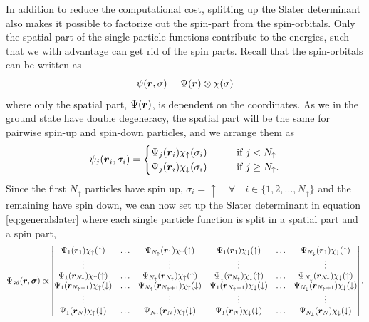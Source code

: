 In addition to reduce the computational cost, splitting up the Slater determinant also makes it possible to factorize out the spin-part from the spin-orbitals. Only the spatial part of the single particle functions contribute to the energies, such that we with advantage can get rid of the spin parts. Recall that the spin-orbitals can be written as 
\begin{equation}
\psi(\boldsymbol{{r}},\sigma)=\Psi(\boldsymbol{{r}})\otimes\chi(\sigma) 
\end{equation}
where only the spatial part, $\Psi(\boldsymbol{{r}})$, is dependent on the coordinates. As we in the ground state have double degeneracy, the spatial part will be the same for pairwise spin-up and spin-down particles, and we arrange them as
\begin{equation}
\psi_j(\boldsymbol{{r}}_i,\sigma_i)=
\begin{cases}
\Psi_j(\boldsymbol{{r}}_i)\chi_{\uparrow}(\sigma_i)\quad\quad&\text{if } j<N_{\uparrow}\\
\Psi_j(\boldsymbol{{r}}_i)\chi_{\downarrow}(\sigma_i)\quad\quad&\text{if } j\geq N_{\uparrow}.
\end{cases}
\end{equation}
Since the first $N_{\uparrow}$ particles have spin up, $\sigma_i=\uparrow\quad\forall\quad i\in\{1,2,...,N_{\uparrow}\}$ and the remaining have spin down, we can now set up the Slater determinant in equation \eqref{eq:generalslater} where each single particle function is split in a spatial part and a spin part,
\begin{equation}
\Psi_{sd}(\boldsymbol{r},\boldsymbol{{\sigma}})\propto
\begin{vmatrix}
\Psi_1(\boldsymbol{r}_1)\chi_{\uparrow}(\uparrow) & \hdots & \Psi_{N_{\uparrow}}(\boldsymbol{r}_1)\chi_{\uparrow}(\uparrow) & \Psi_{1}(\boldsymbol{r}_1)\chi_{\downarrow}(\uparrow) & \hdots & \Psi_{N_{\downarrow}}(\boldsymbol{r}_1)\chi_{\downarrow}(\uparrow)\\
\vdots & & \vdots & \vdots & & \vdots \\
\Psi_1(\boldsymbol{r}_{N_{\uparrow}})\chi_{\uparrow}(\uparrow) & \hdots & \Psi_{N_{\uparrow}}(\boldsymbol{r}_{N_{\uparrow}})\chi_{\uparrow}(\uparrow) & \Psi_{1}(\boldsymbol{r}_{N_{\uparrow}})\chi_{\downarrow}(\uparrow) & \hdots & \Psi_{N_{\downarrow}}(\boldsymbol{r}_{N_{\uparrow}})\chi_{\downarrow}(\uparrow)\\
\Psi_1(\boldsymbol{r}_{N_{\uparrow}+1})\chi_{\uparrow}(\downarrow) & \hdots & \Psi_{N_{\uparrow}}(\boldsymbol{r}_{N_{\uparrow}+1})\chi_{\uparrow}(\downarrow) & \Psi_{1}(\boldsymbol{r}_{N_{\uparrow}+1})\chi_{\downarrow}(\downarrow) & \hdots & \Psi_{N_{\downarrow}}(\boldsymbol{r}_{N_{\uparrow}+1})\chi_{\downarrow}(\downarrow)\\
\vdots & & \vdots & \vdots & & \vdots \\
\Psi_1(\boldsymbol{r}_N)\chi_{\uparrow}(\downarrow) & \hdots & \Psi_{N_{\uparrow}}(\boldsymbol{r}_N)\chi_{\uparrow}(\downarrow) & \Psi_{1}(\boldsymbol{r}_N)\chi_{\downarrow}(\downarrow) & \hdots & \Psi_{N_{\downarrow}}(\boldsymbol{r}_N)\chi_{\downarrow}(\downarrow)\\
\end{vmatrix}.
\end{equation}
